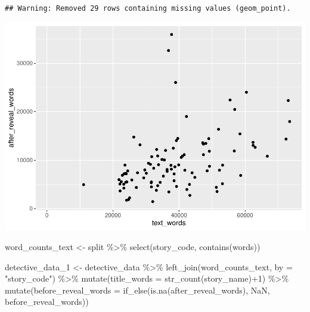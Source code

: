 \documentclass[
]{article}
\newenvironment{Shaded}{\begin{snugshade}}{\end{snugshade}}
\newcommand{\AttributeTok}[1]{\textcolor[rgb]{0.77,0.63,0.00}{#1}}
\newcommand{\ConstantTok}[1]{\textcolor[rgb]{0.00,0.00,0.00}{#1}}
\newcommand{\DecValTok}[1]{\textcolor[rgb]{0.00,0.00,0.81}{#1}}
\newcommand{\FunctionTok}[1]{\textcolor[rgb]{0.00,0.00,0.00}{#1}}
\newcommand{\NormalTok}[1]{#1}
\newcommand{\OtherTok}[1]{\textcolor[rgb]{0.56,0.35,0.01}{#1}}
\newcommand{\SpecialCharTok}[1]{\textcolor[rgb]{0.00,0.00,0.00}{#1}}
\newcommand{\StringTok}[1]{\textcolor[rgb]{0.31,0.60,0.02}{#1}}
\begin{document}
\begin{verbatim}
## Warning: Removed 29 rows containing missing values (geom_point).
\end{verbatim}

\includegraphics{data-wrangling_files/figure-latex/unnamed-chunk-6-1.pdf}

\begin{Shaded}
\begin{Highlighting}[]
\NormalTok{word\_counts\_text }\OtherTok{\textless{}{-}}\NormalTok{ split }\SpecialCharTok{\%\textgreater{}\%} 
  \FunctionTok{select}\NormalTok{(story\_code, }\FunctionTok{contains}\NormalTok{(words))}
\end{Highlighting}
\end{Shaded}

\begin{Shaded}
\begin{Highlighting}[]
\NormalTok{detective\_data\_1 }\OtherTok{\textless{}{-}}\NormalTok{ detective\_data }\SpecialCharTok{\%\textgreater{}\%} 
  \FunctionTok{left\_join}\NormalTok{(word\_counts\_text, }\AttributeTok{by =} \StringTok{"story\_code"}\NormalTok{) }\SpecialCharTok{\%\textgreater{}\%} 
  \FunctionTok{mutate}\NormalTok{(}\AttributeTok{title\_words =} \FunctionTok{str\_count}\NormalTok{(story\_name)}\SpecialCharTok{+}\DecValTok{1}\NormalTok{) }\SpecialCharTok{\%\textgreater{}\%} 
  \FunctionTok{mutate}\NormalTok{(}\AttributeTok{before\_reveal\_words =} \FunctionTok{if\_else}\NormalTok{(}\FunctionTok{is.na}\NormalTok{(after\_reveal\_words), }\ConstantTok{NaN}\NormalTok{, before\_reveal\_words))}
\end{Highlighting}
\end{Shaded}
\end{document}
